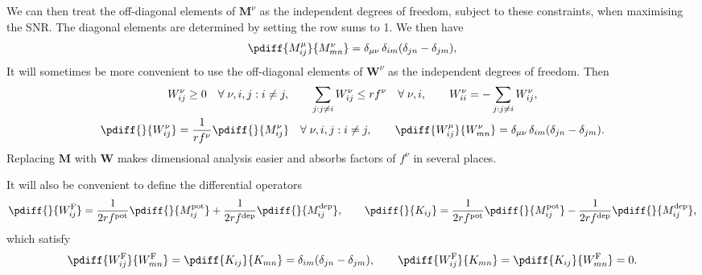 \documentclass[12pt]{article}
\newcommand{\Wm}{W}
\newcommand{\W}{\mathbf{\Wm}}
\newcommand{\MMdm}{M}
\newcommand{\MMd}{\mathbf{\MMdm}}
\newcommand{\encm}{K}
\newcommand{\enc}{\mathbf{\encm}}
\newcommand{\frgm}{\Wm^{\mathrm{F}}}
\newcommand{\frg}{\W^{\mathrm{F}}}
\newcommand{\pot}{^{\text{pot}}}
\newcommand{\dep}{^{\text{dep}}}
\begin{document}
We can then treat the off-diagonal elements of \(\MMd^\nu\) as the independent degrees of freedom, subject to these constraints, when maximising the SNR.
The diagonal elements are determined by setting the row sums to 1.
We then have
%
\begin{equation}\label{eq:derivpd}
  \pdiff{\MMdm^\mu_{ij}}{\MMdm^\nu_{mn}} 
      = \delta_{\mu\nu}\, \delta_{im}(\delta_{jn}-\delta_{jm}),
\end{equation}
%
It will sometimes be more convenient to use the off-diagonal elements of \(\W^\nu \) as the independent degrees of freedom.
Then
%
\begin{equation}\label{eq:wdof}
\begin{gathered}
  \Wm^\nu_{i j} \geq 0
    \quad \forall \; \nu, i, j : i \neq j, \qquad
  \sum_{j : j\neq i} \Wm^\nu_{ij} \leq r f^\nu
    \quad \forall \; \nu, i, \qquad
  \Wm^\nu_{ii} = - \sum_{j : j\neq i} \Wm^\nu_{ij}, \\
  \pdiff{}{\Wm^\nu_{ij}} = \frac{1}{rf^\nu} \pdiff{}{\MMdm^\nu_{ij}} 
    \quad \forall \; \nu, i, j : i \neq j, \qquad
  \pdiff{\Wm^\mu_{ij}}{\Wm^\nu_{mn}} 
      = \delta_{\mu\nu}\, \delta_{im}(\delta_{jn}-\delta_{jm}).
\end{gathered}
\end{equation}
%
Replacing \(\MMd\) with \(\W\) makes dimensional analysis easier and absorbs factors of \(f^\nu\) in several places.

It will also be convenient to define the differential operators
%
\begin{equation}\label{eq:pertfe}
  \pdiff{}{\frgm_{ij}} = \frac{1}{2rf\pot} \pdiff{}{\MMdm \pot_{ij}} + \frac{1}{2rf\dep} \pdiff{}{\MMdm \dep_{ij}},
  \qquad
  \pdiff{}{\encm_{ij}} = \frac{1}{2rf\pot} \pdiff{}{\MMdm \pot_{ij}} - \frac{1}{2rf\dep} \pdiff{}{\MMdm \dep_{ij}},
\end{equation}
%
which satisfy
%
\begin{equation}\label{eq:derivfe}
  \pdiff{\frgm_{ij}}{\frgm_{mn}} = \pdiff{\encm_{ij}}{\encm_{mn}} = \delta_{im}(\delta_{jn}-\delta_{jm}),
  \qquad
  \pdiff{\frgm_{ij}}{\encm_{mn}} = \pdiff{\encm_{ij}}{\frgm_{mn}} = 0.
\end{equation}
%

\end{document}
